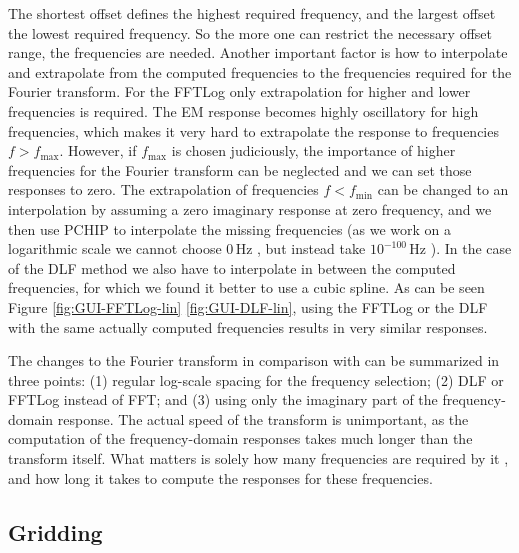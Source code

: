 \documentclass[extra, camera,%
    final,       %
]{gji}
\begin{document}
The shortest offset defines the highest required frequency, and the largest
offset the lowest required frequency. So the more one can restrict the
necessary offset range, the  frequencies are needed.
Another important factor is how to interpolate and extrapolate from the
computed frequencies to the frequencies required for the Fourier transform. For
the FFTLog only extrapolation for higher and lower frequencies is required. The
EM response becomes highly oscillatory for high frequencies, which makes it
very hard to extrapolate the response to frequencies $f>f_\mathrm{max}$.
However, if $f_\mathrm{max}$ is chosen judiciously, the importance of higher
frequencies for the Fourier transform can be neglected and we can set those
responses to zero. The extrapolation of frequencies $f<f_\mathrm{min}$ can be
changed to an interpolation by assuming a zero imaginary response at zero
frequency, and we then use PCHIP to interpolate the missing frequencies (as we
work on a logarithmic scale we cannot choose 0\,Hz , but
instead take $10^{-100}$\,Hz ). In the case of the
DLF method we also have to interpolate in between the computed frequencies, for
which we found it better to use a cubic spline. As can be seen  Figure \ref{fig:GUI-FFTLog-lin}  \ref{fig:GUI-DLF-lin}, using the FFTLog or the DLF with the same
actually computed frequencies results in very similar responses.

The changes to the Fourier transform in comparison with \cite{GEO.08.Mulder}
can be summarized in three points: (1) regular log-scale spacing for the
frequency selection; (2) DLF or FFTLog instead of FFT; and (3) using only the
imaginary part of the frequency-domain response. The actual speed of the
transform is unimportant, as the computation of the frequency-domain responses
takes much longer than the transform itself. What matters is solely how many
frequencies are required by it , and how long it takes to compute the responses for these
frequencies.

\subsection{Gridding}   %
\end{document}
